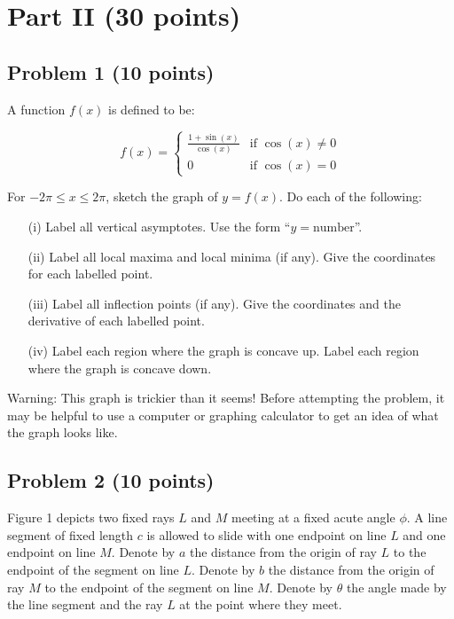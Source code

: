 \documentclass[12pt]{article}
\begin{document}
\section*{Part II (30 points)}
\subsection*{Problem 1 (10 points)}
A function \( f(x) \) is defined to be:

\[
f(x) = \begin{cases}
\frac{1 + \sin(x)}{\cos(x)} & \text{if } \cos(x) \neq 0 \\
0 & \text{if } \cos(x) = 0
\end{cases}
\]

For \( -2\pi \leq x \leq 2\pi\), sketch the graph of \( y = f(x) \). Do each of the following:
\begin{enumerate}
    \item[(i)] Label all vertical asymptotes. Use the form “\( y = \text{number} \)”.
    \item[(ii)] Label all local maxima and local minima (if any). Give the coordinates for each labelled point.
    \item[(iii)] Label all inflection points (if any). Give the coordinates and the derivative of each labelled point.
    \item[(iv)] Label each region where the graph is concave up. Label each region where the graph is concave down.
\end{enumerate}

Warning: This graph is trickier than it seems! Before attempting the problem, it may be helpful to use a computer or graphing calculator to get an idea of what the graph looks like.

\subsection*{Problem 2 (10 points)}
Figure 1 depicts two fixed rays \( L \) and \( M \) meeting at a fixed acute angle \( \phi \). A line segment of fixed length \( c \) is allowed to slide with one endpoint on line \( L \) and one endpoint on line \( M \). Denote by \( a \) the distance from the origin of ray \( L \) to the endpoint of the segment on line \( L \). Denote by \( b \) the distance from the origin of ray \( M \) to the endpoint of the segment on line \( M \). Denote by \( \theta \) the angle made by the line segment and the ray \( L \) at the point where they meet. 
\end{document}
